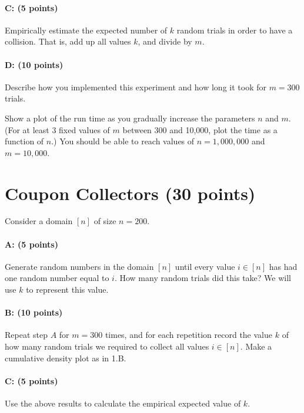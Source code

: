 \documentclass[11pt]{article}
\begin{document}
\paragraph{C: (5 points)}  
Empirically estimate the expected number of $k$ random trials in order to have a collision.  That is, add up all values $k$, and divide by $m$.  

\paragraph{D: (10 points)}  
Describe how you implemented this experiment and how long it took for $m = 300$ trials.  

Show a plot of the run time as you gradually increase the parameters $n$ and $m$.  
(For at least 3 fixed values of $m$ between 300 and 10,000, plot the time as a function of $n$.)
You should be able to reach values of $n = 1{,}000{,}000$ and $m = 10{,}000$.  


\section{Coupon Collectors (30 points)}

Consider a domain $[n]$ of size $n = 200$.  

\paragraph{A: (5 points)}
Generate random numbers in the domain $[n]$ until every value $i \in [n]$ has had one random number equal to $i$.
How many random trials did this take?  
We will use $k$ to represent this value.  

\paragraph{B: (10 points)}
Repeat step $A$ for $m=300$ times, and for each repetition record the value $k$ of how many random trials we required to collect all values $i \in [n]$.  
Make a cumulative density plot as in 1.B.  

\paragraph{C: (5 points)}
Use the above results to calculate the empirical expected value of $k$.
\end{document}
